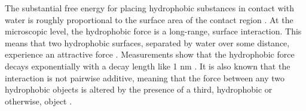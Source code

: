 The substantial free energy for placing hydrophobic substances in contact with water 
is roughly proportional to the surface area of the contact region \cite{Bjorneholm2016}.  
At the microscopic level, the hydrophobic force is a long-range, surface
interaction.  This means that two hydrophobic surfaces, separated by
water over some distance, experience an attractive force
\cite{Lum1999,Meyer2006,Hammer2010}.  Measurements show that the
hydrophobic force decays exponentially with a decay length like 1 nm
\cite{Israelachvili1984, Marcelja1977,Christenson2001,Lin2005}. It is
also known that the interaction is not pairwise additive, meaning that
the force between any two hydrophobic objects is altered by the presence
of a third, hydrophobic or otherwise, object \cite{SilveraBatista1242477}. 

